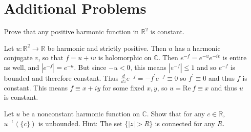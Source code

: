 \documentclass{article}
\newcounter{Problem}
\newenvironment{Problem}{\begin{Exercise}[name={Problem},
                                          counter={Problem}]}
                        {\end{Exercise}}
\begin{document}
\section{Additional Problems}
\begin{Problem}
Prove that any positive harmonic function in $\mathbb{R}^2$ is constant.
\end{Problem}

\begin{Answer}
Let $u : \mathbb{R}^2 \to \mathbb{R}$ be harmonic and strictly
positive. Then $u$ has a harmonic conjugate $v$, so that
$f = u + i v$ is holomorphic on $\mathbb{C}$. Then
$e^{-f} = e^{-u} e^{-iv}$ is entire as well, and $|e^{-f}| = e^{-u}$.
But since $-u < 0$, this means $|e^{-f}| \leq 1$ and so $e^{-f}$
is bounded and therefore constant. Thus
$\frac{d}{dz} e^{-f} = -f^\prime e^{-f} \equiv 0$  so $f^\prime \equiv
0$ and thus $f$ is constant.
This means $f \equiv x + i y$ for some
fixed $x, y$, so $u = \mathrm{Re}~f \equiv x$ and thus $u$ is constant.
\end{Answer}

\begin{Problem}
Let $u$ be a nonconstant harmonic function on $\mathbb{C}$. Show that
for any $c \in \mathbb{R}$, $u^{-1}(\{ c \})$ is unbounded.
Hint: The set $\{ |z| > R \}$ is connected for any $R$.
\end{Problem}
\end{document}
